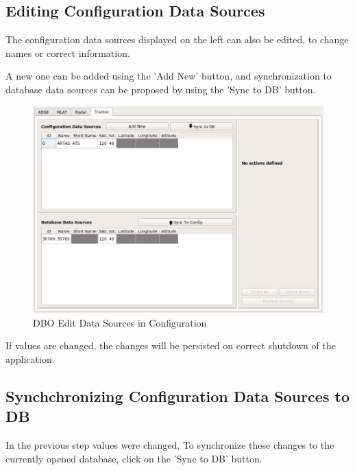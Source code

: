 \subsection{Editing Configuration Data Sources}

The configuration data sources displayed on the left can also be edited, to change names or correct information.

A new one can be added using the 'Add New' button, and synchronization to database data sources can be proposed by using the 'Sync to DB' button. \\

\begin{figure}[H]
  \center
    \includegraphics[width=16cm,frame]{../screenshots/manage_data_sources_edit_ds_cfg.png}
  \caption{DBO Edit Data Sources in Configuration}
\end{figure}

If values are changed, the changes will be persisted on correct shutdown of the application.

\subsection{Synchchronizing Configuration Data Sources to DB}

In the previous step values were changed. To synchronize these changes to the currently opened database, click on the 'Sync to DB' button.

